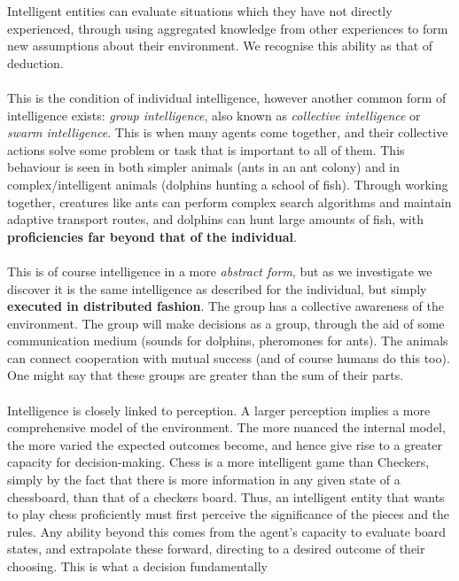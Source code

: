 \documentclass[10pt,a4paper]{article}
\begin{document}
				Intelligent entities can evaluate situations which they have not
				directly experienced, through using aggregated knowledge from other
				experiences to form new assumptions about their environment. We
				recognise this ability as that of deduction. \\\\ This is the condition
				of individual intelligence, however another common form of intelligence
				exists: \textsl{group intelligence}, also known as \textsl{collective
				intelligence} or \textsl{swarm intelligence}. This is when many agents
				come together, and their collective actions solve some problem or task
				that is important to all of them. This behaviour is seen in both simpler
				animals (ants in an ant colony) and in complex/intelligent animals
				(dolphins hunting a school of fish). Through working together, creatures
				like ants can perform complex search algorithms and maintain adaptive
				transport routes, and dolphins can hunt large amounts of fish, with
				\textbf{proficiencies far beyond that of the individual}. \\\\ This is
				of course intelligence in a more \textsl{abstract form}, but as we
				investigate we discover it is the same intelligence as described for the
				individual, but simply \textbf{executed in distributed fashion}. The
				group has a collective awareness of the environment. The group will make
				decisions as a group, through the aid of some communication medium
				(sounds for dolphins, pheromones for ants). The animals can connect
				cooperation with mutual success (and of course humans do this too). One
				might say that these groups are greater than the sum of their parts. \\\\
				Intelligence is closely linked to perception. A larger perception
				implies a more comprehensive model of the environment. The more nuanced
				the internal model, the more varied the expected outcomes become, and
				hence give rise to a greater capacity for decision-making. Chess is a
				more intelligent game than Checkers, simply by the fact that there is
				more information in any given state of a chessboard, than that of a
				checkers board. Thus, an intelligent entity that wants to play chess
				proficiently must first perceive the significance of the pieces and the
				rules. Any ability beyond this comes from the agent's capacity to
				evaluate board states, and extrapolate these forward, directing to a
				desired outcome of their choosing. This is what a decision fundamentally
\end{document}
